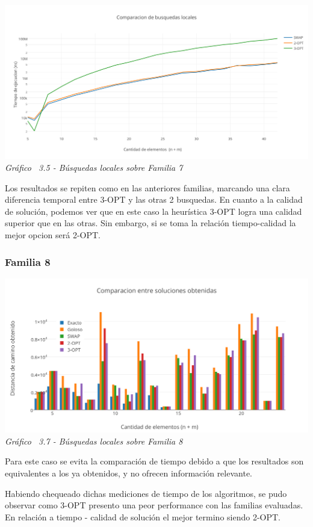 \vspace*{0.3cm} \vspace*{0.3cm}
  \begin{center}
 \includegraphics[scale=0.5]{./EJ3/comparacionbusquedaslocalesanillos.png}
 {            \textit{Gráfico \ 3.5 - Búsquedas locales sobre Familia 7}}
  \end{center}
  \vspace*{0.3cm}
  
  
  Los resultados se repiten como en las anteriores familias, marcando una clara diferencia temporal entre 3-OPT y las otras 2 busquedas. En cuanto a la calidad de soluci\'on, podemos ver que en este caso la heur\'istica 3-OPT logra una calidad superior que en las otras. Sin embargo, si se toma la relaci\'on tiempo-calidad la mejor opcion ser\'a 2-OPT.
  
  
\subsubsection*{Familia 8}

\vspace*{0.3cm} \vspace*{0.3cm}
  \begin{center}
 \includegraphics[scale=0.5]{./EJ3/comparacionbusquedaslocalessolucionrandom.png}
 {            \textit{Gráfico \ 3.7 - Búsquedas locales sobre Familia 8}}
  \end{center}
  \vspace*{0.3cm}
  

  Para este caso se evita la comparación de tiempo debido a que los resultados son equivalentes a los ya obtenidos, y no ofrecen información relevante.
  

Habiendo chequeado dichas mediciones de tiempo de los algoritmos, se pudo observar como 3-OPT presento una peor performance con las familias evaluadas. En relaci\'on a tiempo - calidad de soluci\'on el mejor termino siendo 2-OPT.